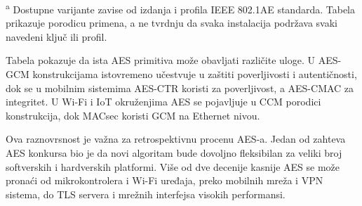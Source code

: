 \begin{table}[htbp]
\vspace{1mm}
\noindent\begin{minipage}{\textwidth}
\footnotesize
\textsuperscript{a} Dostupne varijante zavise od izdanja i profila
IEEE 802.1AE standarda. Tabela prikazuje porodicu primena, a ne tvrdnju
da svaka instalacija podržava svaki navedeni ključ ili profil.
\end{minipage}
\end{table}
\FloatBarrier

Tabela pokazuje da ista AES primitiva može obavljati različite uloge.
U AES-GCM konstrukcijama istovremeno učestvuje u zaštiti poverljivosti
i autentičnosti, dok se u mobilnim sistemima AES-CTR koristi za
poverljivost, a AES-CMAC za integritet. U Wi-Fi i IoT okruženjima AES
se pojavljuje u CCM porodici konstrukcija, dok MACsec koristi GCM na
Ethernet nivou.

Ova raznovrsnost je važna za retrospektivnu procenu AES-a. Jedan od
zahteva AES konkursa bio je da novi algoritam bude dovoljno fleksibilan
za veliki broj softverskih i hardverskih platformi. Više od dve
decenije kasnije AES se može pronaći od mikrokontrolera i Wi-Fi uređaja,
preko mobilnih mreža i VPN sistema, do TLS servera i mrežnih
interfejsa visokih performansi.
